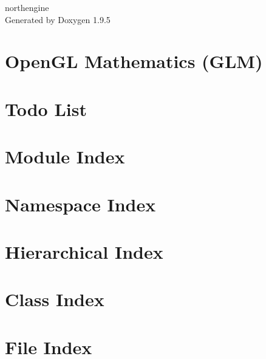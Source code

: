 \documentclass[twoside]{book}
\newcommand{\+}{\discretionary{\mbox{\scriptsize$\hookleftarrow$}}{}{}}
\newcommand{\clearemptydoublepage}{%
    \newpage{\pagestyle{empty}\cleardoublepage}%
  }
\begin{document}
  \raggedbottom
    \hypersetup{pageanchor=false,
                bookmarksnumbered=true,
                pdfencoding=unicode
               }
  \begin{titlepage}
  \vspace*{7cm}
  \begin{center}%
  {\Large northengine}\\
  \vspace*{1cm}
  {\large Generated by Doxygen 1.9.5}\\
  \end{center}
  \end{titlepage}
  \clearemptydoublepage
  \tableofcontents
  \clearemptydoublepage
  \hypersetup{pageanchor=true}
\chapter{Open\+GL Mathematics (GLM)}
\label{index}\hypertarget{index}{}
\chapter{Todo List}
\label{todo}

\chapter{Module Index}

\chapter{Namespace Index}

\chapter{Hierarchical Index}

\chapter{Class Index}

\chapter{File Index}

\end{document}
